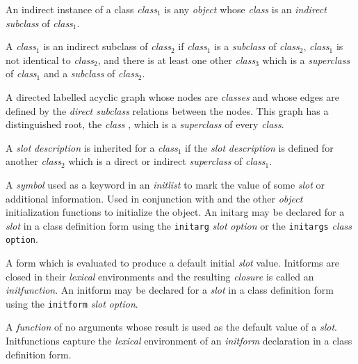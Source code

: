 \begin{optDefinition}
\begin{definitions}
     An indirect instance of a
    class {\em class$_1$} is any {\em object} whose {\em class} is an {\em
        indirect} {\em subclass} of {\em class$_1$}.

     A {\em class$_1$} is an
    indirect subclass of {\em class$_2$} if {\em class$_1$} is a {\em subclass}
    of {\em class$_2$}, {\em class$_1$} is not identical to {\em class$_2$}, and
    there is at least one other {\em class$_3$} which is a {\em superclass} of
    {\em class$_1$} and a {\em subclass} of {\em class$_2$}.

      A directed
    labelled acyclic graph whose nodes are {\em classes} and whose edges are
    defined by the {\em direct subclass} relations between the nodes.  This
    graph has a distinguished root, the {\em class} , which is
    a {\em superclass} of every {\em class}.

     A {\em slot} {\em description} is inherited for a {\em
        class$_1$} if the {\em slot} {\em description} is defined for another
    {\em class$_2$} which is a direct or indirect {\em superclass} of {\em
        class$_1$}.

      A {\em symbol} used as a
    keyword in an {\em initlist} to mark the value of some {\em slot} or
    additional information.  Used in conjunction with  and the
    other {\em object} initialization functions to initialize the object.  An
    initarg may be declared for a {\em slot} in a class definition form using
    the {\tt initarg} {\em slot} {\em option} or the {\tt initargs} {\em class}
    {\tt option}.

      A form which is evaluated to
    produce a default initial {\em slot} value.  Initforms are closed in their
    {\em lexical} environments and the resulting {\em closure} is called an {\em
        initfunction}.  An initform may be declared for a {\em slot} in a class
    definition form using the {\tt initform} {\em slot} {\em option}.

      A {\em function} of
    no arguments whose result is used as the default value of a {\em slot}.
    Initfunctions capture the {\em lexical} environment of an {\em initform}
    declaration in a class definition form.


\end{definitions}
\end{optDefinition}
